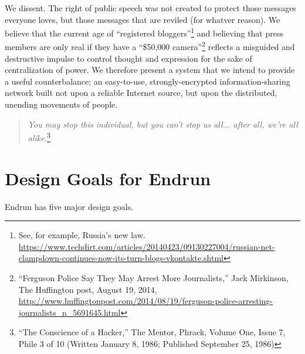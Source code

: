 \documentclass[12pt]{article}
\begin{document}
  We dissent. The right of public speech was not created to protect those messages everyone loves, but those messages that are reviled (for whatver reason). We believe that the current age of ``registered bloggers''\footnote{See, for example, Russia's new law. \url{https://www.techdirt.com/articles/20140423/09130227004/russian-net-clampdown-continues-now-its-turn-blogs-vkontakte.shtml}} and believing that press members are only real if they have a ``\$50,000 camera''\footnote{``Ferguson Police Say They May Arrest More Journalists,'' Jack Mirkinson, The Huffington post, August 19, 2014, \url{http://www.huffingtonpost.com/2014/08/19/ferguson-police-arresting-journalists_n_5691645.html}} reflects a misguided and destructive impulse to control thought and expression for the sake of centralization of power. We therefore present a system that we intend to provide a useful counterbalance; an easy-to-use, strongly-encrypted information-sharing network built not upon a reliable Internet source, but upon the distributed, unending movements of people. 
  
  \begin{quote}
    \emph{You may stop this individual, but you can't stop us all... after all, we're all alike.}\footnote{``The Conscience of a Hacker,'' The Mentor, Phrack, Volume One, Issue 7, Phile 3 of 10 (Written January 8, 1986; Published September 25, 1986)}
  \end{quote}
  
  \section{Design Goals for Endrun}
  
  Endrun has five major design goals.
  
\end{document}

